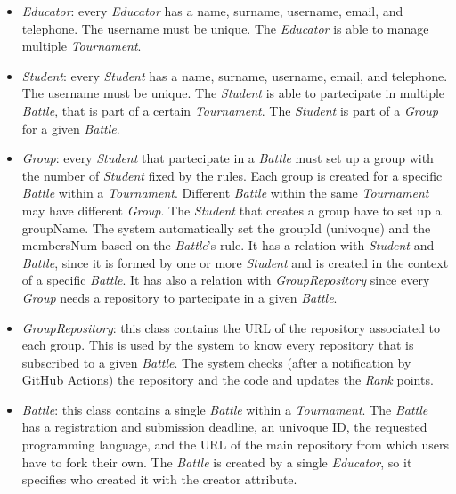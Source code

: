 \documentclass[12pt, a4paper]{report}
\begin{document}
    \begin{itemize}
        \item \textit{Educator}: every \textit{Educator} has a name, surname, username, email, and telephone. 
            The username must be unique. 
            The \textit{Educator} is able to manage multiple \textit{Tournament}. 
        \item \textit{Student}: every \textit{Student} has a name, surname, username, email, and telephone. 
            The username must be unique. 
            The \textit{Student} is able to partecipate in multiple \textit{Battle}, that is part of a certain \textit{Tournament}. 
            The \textit{Student} is part of a \textit{Group} for a given \textit{Battle}.     
        \item \textit{Group}: every \textit{Student} that partecipate in a \textit{Battle} must set up a group with the number of \textit{Student} fixed by the rules. 
            Each group is created for a specific \textit{Battle} within a \textit{Tournament}. 
            Different \textit{Battle} within the same \textit{Tournament} may have different \textit{Group}. 
            The \textit{Student} that creates a group have to set up a groupName. 
            The system automatically set the groupId (univoque) and the membersNum based on the \textit{Battle}'s rule. 
            It has a relation with \textit{Student} and \textit{Battle}, since it is formed by one or more \textit{Student} and is created in the context of a specific \textit{Battle}. 
            It has also a relation with \textit{GroupRepository} since every \textit{Group} needs a repository to partecipate in a given \textit{Battle}. 
        \item \textit{GroupRepository}: this class contains the URL of the repository associated to each group. 
            This is used by the system to know every repository that is subscribed to a given \textit{Battle}. 
            The system checks (after a notification by GitHub Actions) the repository and the code and updates the \textit{Rank} points. 
        \item \textit{Battle}: this class contains a single \textit{Battle} within a \textit{Tournament}.
            The \textit{Battle} has a registration and submission deadline, an univoque ID, the requested programming language, and the URL of the main repository from which users have to fork their own.
            The \textit{Battle} is created by a single \textit{Educator}, so it specifies who created it with the creator attribute. 

\end{itemize}
\end{document}
